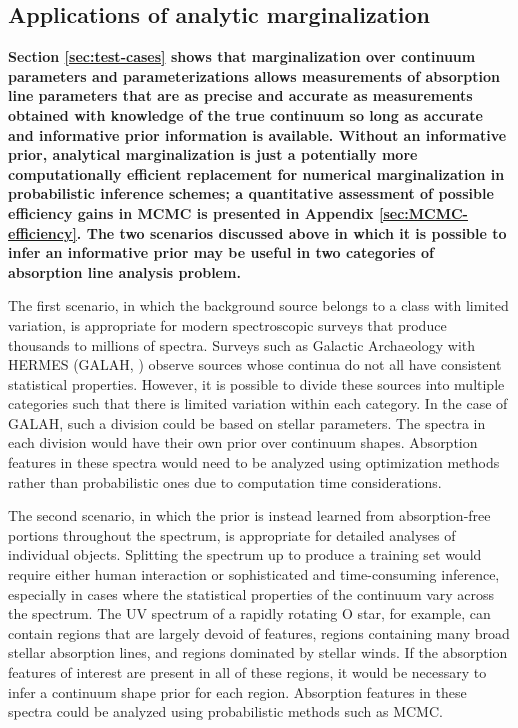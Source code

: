 \documentclass[manuscript]{aastex62}
\begin{document}
\subsection{Applications of analytic marginalization}
{\bf
Section \ref{sec:test-cases} shows that marginalization over continuum parameters and parameterizations allows measurements of absorption line parameters that are as precise and accurate as measurements obtained with knowledge of the true continuum so long as accurate and informative prior information is available.
Without an informative prior, analytical marginalization is just a potentially more computationally efficient replacement for numerical marginalization in probabilistic inference schemes; a quantitative assessment of possible efficiency gains in MCMC is presented in Appendix \ref{sec:MCMC-efficiency}.
The two scenarios discussed above in which it is possible to infer an informative prior may be useful in two categories of absorption line analysis problem.

The first scenario, in which the background source belongs to a class with limited variation, is appropriate for modern spectroscopic surveys that produce thousands to millions of spectra.
Surveys such as Galactic Archaeology with HERMES (GALAH, \citealt{2018MNRAS.478.4513B}) observe sources whose continua do not all have consistent statistical properties.
However, it is possible to divide these sources into multiple categories such that there is limited variation within each category.
In the case of GALAH, such a division could be based on stellar parameters.
The spectra in each division would have their own prior over continuum shapes.
Absorption features in these spectra would need to be analyzed using optimization methods rather than probabilistic ones due to computation time considerations.

The second scenario, in which the prior is instead learned from absorption-free portions throughout the spectrum, is appropriate for detailed analyses of individual objects.
Splitting the spectrum up to produce a training set would require either human interaction or sophisticated and time-consuming inference, especially in cases where the statistical properties of the continuum vary across the spectrum.
The UV spectrum of a rapidly rotating O star, for example, can contain regions that are largely devoid of features, regions containing many broad stellar absorption lines, and regions dominated by stellar winds.
If the absorption features of interest are present in all of these regions, it would be necessary to infer a continuum shape prior for each region.
Absorption features in these spectra could be analyzed using probabilistic methods such as MCMC.
}
\end{document}
